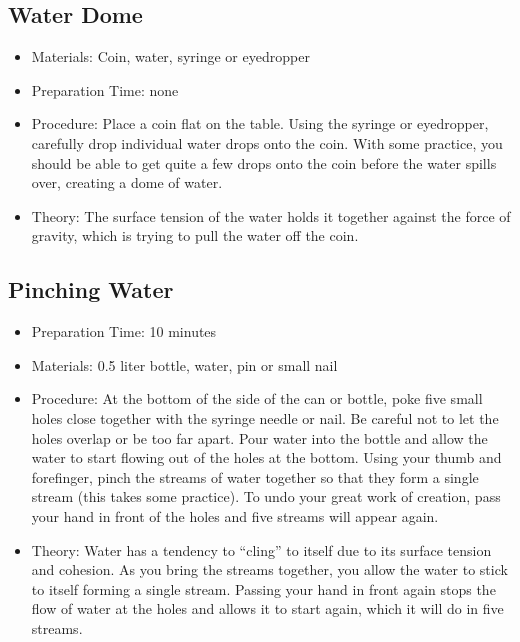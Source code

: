 \subsection{Water Dome}
\begin{itemize}
\item{Materials: Coin, water, syringe or eyedropper}
\item{Preparation Time: none}
\item{Procedure: Place a coin flat on the table. Using the syringe or eyedropper, carefully drop individual water drops onto the coin. With some practice, you should be able to get quite a few drops onto the coin before the water spills over, creating a dome of water.}
\item{Theory: The surface tension of the water holds it together against the force of gravity, which is trying to pull the water off the coin.}
\end{itemize}

\subsection{Pinching Water}
\begin{itemize}
\item{Preparation Time: 10 minutes}
\item{Materials: 0.5 liter bottle, water, pin or small nail}
\item{Procedure: At the bottom of the side of the can or bottle, poke five small holes close together with the syringe needle or nail. Be careful not to let the holes overlap or be too far apart. Pour water into the bottle and allow the water to start flowing out of the holes at the bottom. Using your thumb and forefinger, pinch the streams of water together so that they form a single stream (this takes some practice). To undo your great work of creation, pass your hand in front of the holes and five streams will appear again.}
\item{Theory: Water has a tendency to “cling” to itself due to its surface tension and cohesion. As you bring the streams together, you allow the water to stick to itself forming a single stream. Passing your hand in front again stops the flow of water at the holes and allows it to start again, which it will do in five streams.}
\end{itemize}

